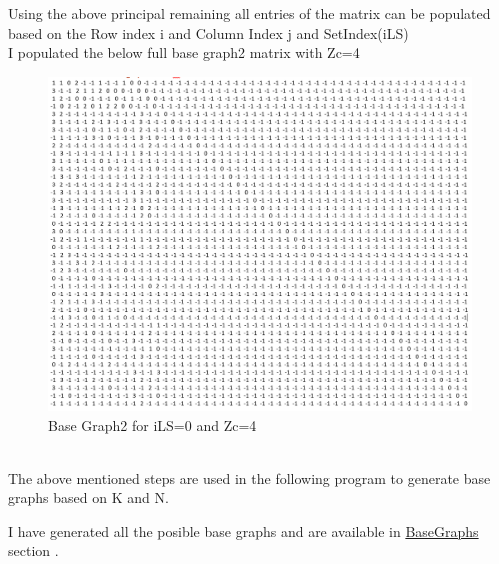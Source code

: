 \documentclass[journal,twocolumn]{IEEEtran}
\begin{document}
{{\begin{enumerate}
  Using the above principal remaining all entries of the matrix can be populated based on the Row index i and Column Index j and SetIndex(iLS)\\
  I populated the below full base graph2 matrix with Zc=4\\
  \vspace{20mm}
     \begin{figure}[h]
 \includegraphics[width=\columnwidth]{../figs/pcm.png}    
     \caption{Base Graph2 for iLS=0 and Zc=4}
  \end{figure}\\
  
  The above mentioned steps are used in the following program to generate base graphs based on K and N.\\
   \begin{center}
       \end{center}
      \vspace{2mm}  
I have generated all the posible base graphs and are available in {\href{https://github.com/KrishnaYadati/IIT-H-FWC-Project/tree/main/5G-NR-LDPC-Encoder/Base_Graphs}{BaseGraphs}} section .\\
 

\end{enumerate}}}
\end{document}
